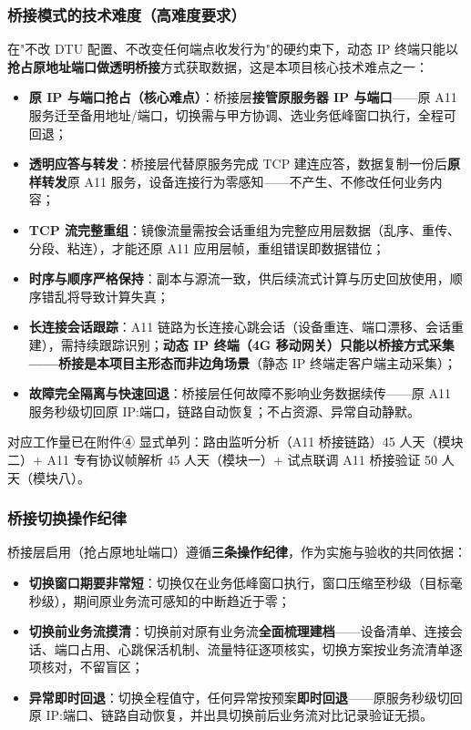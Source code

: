 \documentclass[11pt,a4paper]{ctexart}
\begin{document}
\subsubsection{桥接模式的技术难度（高难度要求）}

在"不改 DTU 配置、不改变任何端点收发行为"的硬约束下，动态 IP 终端只能以\textbf{抢占原地址端口做透明桥接}方式获取数据，这是本项目核心技术难点之一：

\begin{itemize}[leftmargin=*]
  \item \textbf{原 IP 与端口抢占（核心难点）}：桥接层\textbf{接管原服务器 IP 与端口}——原 A11 服务迁至备用地址/端口，切换需与甲方协调、选业务低峰窗口执行，全程可回退；
  \item \textbf{透明应答与转发}：桥接层代替原服务完成 TCP 建连应答，数据复制一份后\textbf{原样转发}原 A11 服务，设备连接行为零感知——不产生、不修改任何业务内容；
  \item \textbf{TCP 流完整重组}：镜像流量需按会话重组为完整应用层数据（乱序、重传、分段、粘连），才能还原 A11 应用层帧，重组错误即数据错位；
  \item \textbf{时序与顺序严格保持}：副本与源流一致，供后续流式计算与历史回放使用，顺序错乱将导致计算失真；
  \item \textbf{长连接会话跟踪}：A11 链路为长连接心跳会话（设备重连、端口漂移、会话重建），需持续跟踪识别；\textbf{动态 IP 终端（4G 移动网关）只能以桥接方式采集——桥接是本项目主形态而非边角场景}（静态 IP 终端走客户端主动采集）；
  \item \textbf{故障完全隔离与快速回退}：桥接层任何故障不影响业务数据续传——原 A11 服务秒级切回原 IP:端口，链路自动恢复；不占资源、异常自动静默。
\end{itemize}

对应工作量已在附件④ 显式单列：路由监听分析（A11 桥接链路）45 人天（模块二）+ A11 专有协议帧解析 45 人天（模块一）+ 试点联调 A11 桥接验证 50 人天（模块八）。

\subsubsection{桥接切换操作纪律}

桥接层启用（抢占原地址端口）遵循\textbf{三条操作纪律}，作为实施与验收的共同依据：

\begin{itemize}[leftmargin=*]
  \item \textbf{切换窗口期要非常短}：切换仅在业务低峰窗口执行，窗口压缩至秒级（目标毫秒级），期间原业务流可感知的中断趋近于零；
  \item \textbf{切换前业务流摸清}：切换前对原有业务流\textbf{全面梳理建档}——设备清单、连接会话、端口占用、心跳保活机制、流量特征逐项核实，切换方案按业务流清单逐项核对，不留盲区；
  \item \textbf{异常即时回退}：切换全程值守，任何异常按预案\textbf{即时回退}——原服务秒级切回原 IP:端口、链路自动恢复，并出具切换前后业务流对比记录验证无损。
\end{itemize}
\end{document}
